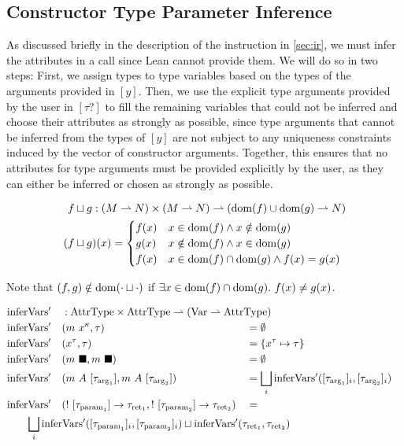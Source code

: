 \subsection{Constructor Type Parameter Inference}

As discussed briefly in the description of the  instruction in \cref{sec:ir}, we must infer the attributes in a  call since Lean cannot provide them. We will do so in two steps: First, we assign types to type variables based on the types of the arguments provided in $[y]$. Then, we use the explicit type arguments provided by the user in $[\tau?]$ to fill the remaining variables that could not be inferred and choose their attributes as strongly as possible, since type arguments that cannot be inferred from the types of $[y]$ are not subject to any uniqueness constraints induced by the vector of constructor arguments. Together, this ensures that no attributes for type arguments must be provided explicitly by the user, as they can either be inferred or chosen as strongly as possible.

\begin{alignat*}{3}
	f &\sqcup g : (M \rightharpoonup N) \times (M \rightharpoonup N) \rightharpoonup (\mathrm{dom}(f) \cup \mathrm{dom}(g) \rightharpoonup N) \\
	(f &\sqcup g)(x) = \begin{cases}
		f(x) & x \in \mathrm{dom}(f) \land x \notin \mathrm{dom}(g) \\
		g(x) & x \notin \mathrm{dom}(f) \land x \in \mathrm{dom}(g) \\
		f(x) & x \in \mathrm{dom}(f) \cap \mathrm{dom}(g) \land f(x) = g(x)
	\end{cases}
\end{alignat*}

Note that $(f, g) \notin \mathrm{dom}(\cdot \sqcup \cdot)$ if $\exists x \in \mathrm{dom}(f) \cap \mathrm{dom}(g).\ f(x) \neq g(x)$.

\newcommand{\inferVarsDash}{\mathrm{inferVars'}}

\begin{alignat*}{3}
	&\inferVarsDash &&: \mathrlap{\AttrType \times \AttrType \rightharpoonup (\Var \rightharpoonup \AttrType)} \\
	&\inferVarsDash&&(m\ x^\kappa, \tau) &&= \emptyset \\
	&\inferVarsDash&&(x^\tau, \tau) &&= \{ x^\tau \mapsto \tau \} \\
	&\inferVarsDash&&(m\ \blacksquare, m\ \blacksquare) &&= \emptyset \\
	&\inferVarsDash&&(m\ A\ [\tau_{\arrg_1}], m\ A\ [\tau_{\arrg_2}]) &&= \bigsqcup_i \inferVarsDash([\tau_{\arrg_1}]_i, [\tau_{\arrg_2}]_i) \\
	&\inferVarsDash&&(!\ [\tau_{\param_1}] \to \tau_{\ret_1}, !\ [\tau_{\param_2}] \to \tau_{\ret_2}) &&= \\
	&\rebreak{\bigsqcup_i \inferVarsDash([\tau_{\param_1}]_i, [\tau_{\param_2}]_i) \sqcup \inferVarsDash(\tau_{\ret_1}, \tau_{\ret_2})}
\end{alignat*}

